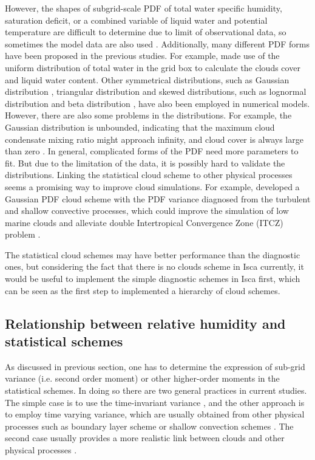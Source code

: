 However, the shapes of subgrid-scale PDF of total water specific humidity, saturation deficit, or a combined variable of liquid water and potential temperature are difficult to determine due to limit of observational data, so sometimes the model data are also used \citep{Bony2001}. Additionally, many different PDF forms have been proposed in the previous studies. For example, \cite{LeTreut1991} made use of the uniform distribution of total water in the grid box to calculate the clouds cover and liquid water content. Other symmetrical distributions, such as Gaussian distribution \citep{Sommeria1977}, triangular distribution \citep{Smith1990} and skewed distributions, such as lognormal distribution \citep{Bony2001} and beta distribution \citep{Tompkins2002}, have also been employed in numerical models. However, there are also some problems in the distributions. For example, the Gaussian distribution is unbounded, indicating that the maximum cloud condensate mixing ratio might approach infinity, and cloud cover is always large than zero \citep{Tompkins2002}. In general, complicated forms of the PDF need more parameters to fit. But due to the limitation of the data, it is possibly hard to validate the distributions. Linking the statistical cloud scheme to other physical processes seems a promising way to improve cloud simulations. For example, \cite{Qin2018} developed a Gaussian PDF cloud scheme with the PDF variance diagnosed from the turbulent
and shallow convective processes, which could improve the simulation of low marine clouds and alleviate double Intertropical Convergence Zone (ITCZ) problem \citep{Qin2018alleviated}.

The statistical cloud schemes may have better performance than the diagnostic ones, but considering the fact that there is no clouds scheme in Isca currently, it would be useful to implement the simple diagnostic schemes in Isca first, which can be seen as the first step to implemented a hierarchy of cloud schemes.

\subsection{Relationship between relative humidity and statistical schemes}

As discussed in previous section, one has to determine the expression of sub-grid variance (i.e. second order moment) or other higher-order moments in the statistical schemes. In doing so there are two general practices in current studies. The simple case is to use the time-invariant variance \citep[e.g.,][]{Sundqvist1978,Smith1990}, and the other approach is to employ time varying variance, which are usually obtained from other physical processes such as boundary layer scheme or shallow convection schemes \citep[e.g.,][]{Qin2018}. The second case usually provides a more realistic link between clouds and other physical processes \citep{Tompkins2002}. 

